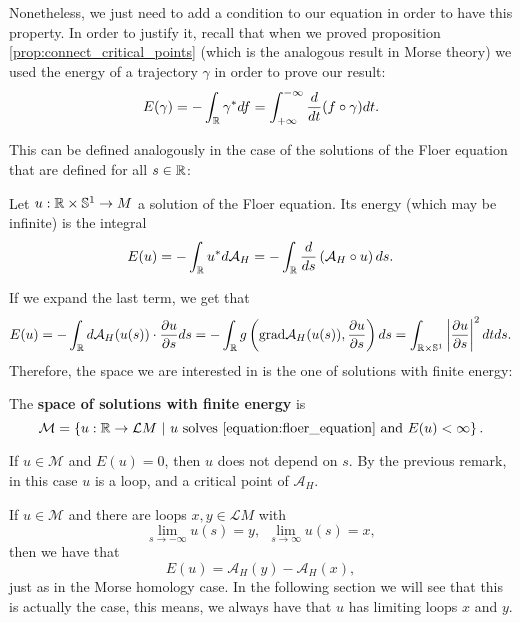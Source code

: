 Nonetheless, we just need to add a condition to our equation in order to have this property. In order to justify it, recall that when we proved proposition \ref{prop:connect_critical_points} (which is the analogous result in Morse theory) we used the energy of a trajectory $\gamma$ in order to prove our result:
\[E(\gamma) = - \int_{\mathbb{R}} \gamma^{\ast} d f = \int_{+\infty}^{-\infty} \frac{d}{d t} (f \circ \gamma) d t .\]

This can be defined analogously in the case of the solutions of the Floer equation that are defined for all $s \in \mathbb{R}$:

\begin{deff} \label{definition:floer_energy}
Let $u : \mathbb{R} \times \mathbb{S}^1 \rightarrow M$ a solution of the Floer equation. Its energy (which may be infinite) is the integral
\[E(u) = - \int_{\mathbb{R}} u^{\ast} d \mathcal{A}_H = - \int_{\mathbb{R}} \frac{d}{d s} \left( \mathcal{A}_H \circ u \right) d s .\]
\end{deff}

If we expand the last term, we get that
\[E(u) = - \int_{\mathbb{R}} d \mathcal{A}_H(u(s)) \cdot \frac{\partial u}{\partial s} d s = - \int_{\mathbb{R}} g \left(\mathrm{grad}\mathcal{A}_H(u(s)),\frac{\partial u}{\partial s} \right) d s = \int_{\mathbb{R} \times \mathbb{S}^1} \left| \frac{\partial u}{\partial s} \right|^2 d t d s .\]
Therefore, the space we are interested in is the one of solutions with finite energy:

\begin{deff} \label{definition:finite_energy_space}
The {\bf space of solutions with finite energy} is
\[\mathcal{M} = \left\{ u : \mathbb{R} \rightarrow \mathcal{L}M \ | \ u \text{ solves \ref{equation:floer_equation} and } E(u) < \infty \right\} .\]
\end{deff}

\begin{rmrk} \label{remark:floer_energy_zero}
If $u \in \mathcal{M}$ and $E(u) = 0$, then $u$ does not depend on $s$. By the previous remark, in this case $u$ is a loop, and a critical point of $\mathcal{A}_H$.
\end{rmrk}

\begin{rmrk} \label{remark:floer_limits}
If $u \in \mathcal{M}$ and there are loops $x,y \in \mathcal{L}M$ with
\[\lim_{s \rightarrow -\infty} u(s) = y, \ \ \lim_{s \rightarrow \infty} u(s) = x ,\]
then we have that
\[E(u) = \mathcal{A}_H(y) - \mathcal{A}_H(x) ,\]
just as in the Morse homology case.
In the following section we will see that this is actually the case, this means, we always have that $u$ has limiting loops $x$ and $y$.
\end{rmrk}
